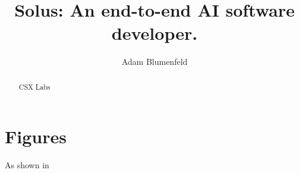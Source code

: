 \documentclass[a4paper,twocolumn,11pt,accepted=2017-05-09]{whitepaper}
\begin{document}
\title{Solus: An end-to-end AI software developer.}

\author{Adam Blumenfeld}
\maketitle

\begin{abstract}
  CSX Labs
\end{abstract}
\section{Figures}
As shown in \cite{bubeck_sparks_2023}

\end{document}
